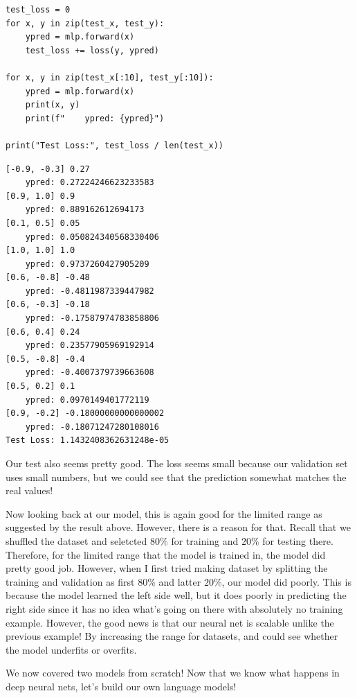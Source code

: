 \documentclass[../../main.tex]{subfiles}
\begin{document}
\begin{jupyter}
\begin{lstlisting}[style=jin]
test_loss = 0
for x, y in zip(test_x, test_y):
    ypred = mlp.forward(x)
    test_loss += loss(y, ypred)

for x, y in zip(test_x[:10], test_y[:10]):
    ypred = mlp.forward(x)
    print(x, y)
    print(f"    ypred: {ypred}")

print("Test Loss:", test_loss / len(test_x))
\end{lstlisting}
\begin{lstlisting}[style=jout]
[-0.9, -0.3] 0.27
    ypred: 0.27224246623233583
[0.9, 1.0] 0.9
    ypred: 0.889162612694173
[0.1, 0.5] 0.05
    ypred: 0.050824340568330406
[1.0, 1.0] 1.0
    ypred: 0.9737260427905209
[0.6, -0.8] -0.48
    ypred: -0.4811987339447982
[0.6, -0.3] -0.18
    ypred: -0.17587974783858806
[0.6, 0.4] 0.24
    ypred: 0.23577905969192914
[0.5, -0.8] -0.4
    ypred: -0.4007379739663608
[0.5, 0.2] 0.1
    ypred: 0.0970149401772119
[0.9, -0.2] -0.18000000000000002
    ypred: -0.18071247280108016
Test Loss: 1.1432408362631248e-05
\end{lstlisting}
\end{jupyter}

Our test also seems pretty good. The loss seems small because our
validation set uses small numbers, but we could see that the
prediction somewhat matches the real values!

Now looking back at our model, this is again good for the limited
range as suggested by the result above. However, there is a reason
for that. Recall that we shuffled the dataset and seletcted $80\%$
for training and $20\%$ for testing there. Therefore, for the limited
range that the model is trained in, the model did pretty good job.
However, when I first tried making dataset by splitting the training
and validation as first $80\%$ and latter $20\%$, our model did
poorly. This is because the model learned the left side well, but
it does poorly in predicting the right side since it has no idea
what's going on there with absolutely no training example. However,
the good news is that our neural net is scalable unlike the previous
example! By increasing the range for datasets, and could see whether
the model underfits or overfits.

We now covered two models from scratch! Now that we know what
happens in deep neural nets, let's build our own language models!
\end{document}
